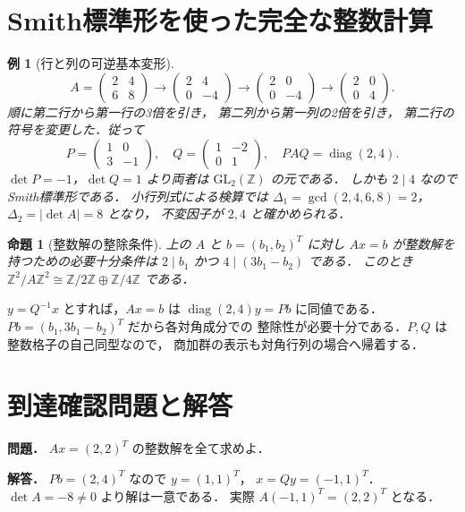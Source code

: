 \documentclass[a5paper,10pt,onecolumn]{jsarticle}
\makeatletter
\theoremstyle{mathnotetheorem}
\newtheorem{proposition}[theorem]{命題}
\newtheorem{example}[theorem]{例}
\renewcommand{\proofname}{証明}
\renewenvironment{proof}[1][\proofname]{%
  \par\pushQED{\qed}\normalfont\topsep4\p@\@plus2\p@\relax
  \trivlist\item[\hskip\labelsep\bfseries #1]\ignorespaces
}{\popQED\endtrivlist\@endpefalse}
\makeatother
\begin{document}
\section{Smith標準形を使った完全な整数計算}
\begin{example}[行と列の可逆基本変形]
\[
 A=\begin{pmatrix}2&4\\6&8\end{pmatrix}
 \longrightarrow\begin{pmatrix}2&4\\0&-4\end{pmatrix}
 \longrightarrow\begin{pmatrix}2&0\\0&-4\end{pmatrix}
 \longrightarrow\begin{pmatrix}2&0\\0&4\end{pmatrix}.
\]
順に第二行から第一行の3倍を引き，
第二列から第一列の2倍を引き，
第二行の符号を変更した．従って
\[
 P=\begin{pmatrix}1&0\\3&-1\end{pmatrix},
 \quad Q=\begin{pmatrix}1&-2\\0&1\end{pmatrix},
 \quad PAQ=\operatorname{diag}(2,4).
\]
$\det P=-1$，$\det Q=1$ より両者は
$\mathrm{GL}_2(\mathbb Z)$ の元である．
しかも $2\mid4$ なのでSmith標準形である．
小行列式による検算では
$\Delta_1=\gcd(2,4,6,8)=2$，
$\Delta_2=|\det A|=8$ となり，
不変因子が $2,4$ と確かめられる．
\end{example}
\begin{proposition}[整数解の整除条件]
上の $A$ と $b=(b_1,b_2)^T$ に対し
$Ax=b$ が整数解を持つための必要十分条件は
$2\mid b_1$ かつ $4\mid(3b_1-b_2)$ である．
このとき $\mathbb Z^2/A\mathbb Z^2
\cong\mathbb Z/2\mathbb Z\oplus\mathbb Z/4\mathbb Z$ である．
\end{proposition}
\begin{proof}
$y=Q^{-1}x$ とすれば，$Ax=b$ は
$\operatorname{diag}(2,4)y=Pb$ に同値である．
$Pb=(b_1,3b_1-b_2)^T$ だから各対角成分での
整除性が必要十分である．$P,Q$ は整数格子の自己同型なので，
商加群の表示も対角行列の場合へ帰着する．
\end{proof}
\section*{到達確認問題と解答}
\noindent\textbf{問題．}
$Ax=(2,2)^T$ の整数解を全て求めよ．

\medskip\noindent\textbf{解答．}
$Pb=(2,4)^T$ なので $y=(1,1)^T$，
$x=Qy=(-1,1)^T$．$\det A=-8\ne0$ より解は一意である．
実際 $A(-1,1)^T=(2,2)^T$ となる．
\end{document}
